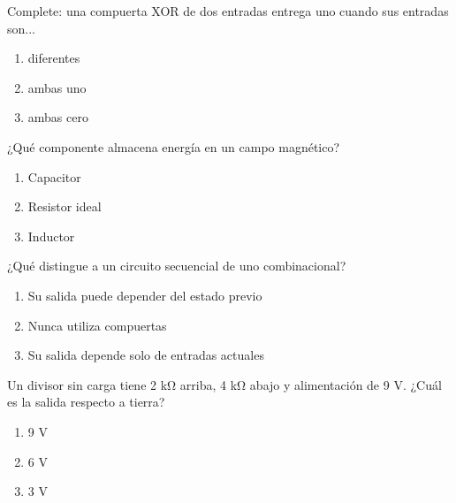 \noindent\begin{minipage}{\linewidth}\setlength{\parskip}{4pt}\label{q:H-005}
Complete: una compuerta XOR de dos entradas entrega uno cuando sus entradas son...
\begin{enumerate}[label=\Alph*),nosep]
\item diferentes
\item ambas uno
\item ambas cero
\end{enumerate}\end{minipage}\par\medskip

\noindent\begin{minipage}{\linewidth}\setlength{\parskip}{4pt}\label{q:H-006}
¿Qué componente almacena energía en un campo magnético?
\begin{enumerate}[label=\Alph*),nosep]
\item Capacitor
\item Resistor ideal
\item Inductor
\end{enumerate}\end{minipage}\par\medskip

\noindent\begin{minipage}{\linewidth}\setlength{\parskip}{4pt}\label{q:H-007}
¿Qué distingue a un circuito secuencial de uno combinacional?
\begin{enumerate}[label=\Alph*),nosep]
\item Su salida puede depender del estado previo
\item Nunca utiliza compuertas
\item Su salida depende solo de entradas actuales
\end{enumerate}\end{minipage}\par\medskip

\noindent\begin{minipage}{\linewidth}\setlength{\parskip}{4pt}\label{q:H-008}
Un divisor sin carga tiene 2 kΩ arriba, 4 kΩ abajo y alimentación de 9 V. ¿Cuál es la salida respecto a tierra?
\begin{enumerate}[label=\Alph*),nosep]
\item 9 V
\item 6 V
\item 3 V
\end{enumerate}\end{minipage}\par\medskip

